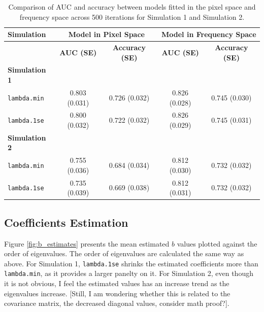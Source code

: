 \documentclass[12pt]{article}
\begin{document}
\begin{table}[h!]
	\centering
	\caption{Comparison of AUC and accuracy between models fitted in the pixel space and frequency space across 500 iterations for Simulation 1 and Simulation 2.}
	\label{tab:auc_acc_table}
	\begin{tabular}{l|cc|cc}
		\toprule
		\textbf{Simulation}   & \multicolumn{2}{c}{\textbf{Model in Pixel Space}} & \multicolumn{2}{c}{\textbf{Model in Frequency Space}}                                              \\
		\midrule
		                      & \textbf{AUC (SE)}                                 & \textbf{Accuracy (SE)}                                & \textbf{AUC (SE)} & \textbf{Accuracy (SE)} \\
		\midrule
		\textbf{Simulation 1} &                                                   &                                                       &                   &                        \\
    \texttt{lambda.min}            & 0.803 (0.031)                                     & 0.726 (0.032)                                         & 0.826 (0.028)     & 0.745 (0.030)          \\
      \texttt{lambda.1se}            & 0.800 (0.032)                                     & 0.722 (0.032)                                         & 0.826 (0.029)     & 0.745 (0.031)          \\
		\midrule
		\textbf{Simulation 2} &                                                   &                                                       &                   &                        \\
    \texttt{lambda.min}            & 0.755 (0.036)                                     & 0.684 (0.034)                                         & 0.812 (0.030)     & 0.732 (0.032)          \\
      \texttt{lambda.1se}            & 0.735 (0.039)                                     & 0.669 (0.038)                                         & 0.812 (0.031)     & 0.732 (0.032)          \\
		\bottomrule
	\end{tabular}
\end{table}

\subsection*{Coefficients Estimation}

Figure \ref{fig:b_estimates} presents the mean estimated \( b \) values plotted against the order of eigenvalues. The order of eigenvalues are calculated the same way as above. For Simulation 1, \texttt{lambda.1se} shrinks the estimated coefficients more than \texttt{lambda.min}, as it provides a larger panelty on it. For Simulation 2, even though it is not obvious, I feel the estimated values has an increase trend as the eigenvalues increase. [Still, I am wondering whether this is related to the covariance matrix, the decreased diagonal values, consider math proof?].
\end{document}
